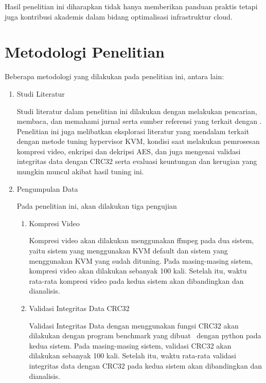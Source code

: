 Hasil penelitian ini diharapkan tidak hanya memberikan panduan praktis tetapi juga kontribusi akademis dalam bidang optimalisasi infrastruktur cloud.

\section{Metodologi Penelitian}
Beberapa metodologi yang dilakukan pada penelitian ini, antara lain:
\begin{enumerate}
      \item Studi Literatur

            Studi literatur dalam penelitian ini dilakukan dengan melakukan pencarian, membaca, dan memahami jurnal serta sumber referensi yang terkait dengan \cc. Penelitian ini juga melibatkan eksplorasi literatur yang mendalam terkait dengan metode tuning hypervisor KVM, kondisi saat melakukan pemrosesan kompresi video, enkripsi dan dekripsi AES, dan juga mengenai validasi integritas data dengan CRC32 serta evaluasi keuntungan dan kerugian yang mungkin muncul akibat hasil tuning ini.

      \item Pengumpulan Data

            Pada penelitian ini, akan dilakukan tiga pengujian
            \begin{enumerate}
                  \item Kompresi Video

                        Kompresi video akan dilakukan menggunakan ffmpeg pada dua sistem, yaitu sistem yang menggunakan KVM default dan sistem yang menggunakan KVM yang sudah dituning. Pada masing-masing sistem, kompresi video akan dilakukan sebanyak 100 kali. Setelah itu, waktu rata-rata kompresi video pada kedua sistem akan dibandingkan dan dianalisis.

                  \item Validasi Integritas Data CRC32

                        Validasi Integritas Data dengan menggunakan fungsi CRC32 akan dilakukan dengan program benchmark yang dibuat \saya\ dengan python pada kedua sistem. Pada masing-masing sistem, validasi CRC32 akan dilakukan sebanyak 100 kali. Setelah itu, waktu rata-rata validasi integritas data dengan CRC32 pada kedua sistem akan dibandingkan dan dianalisis.


\end{enumerate}
\end{enumerate}
